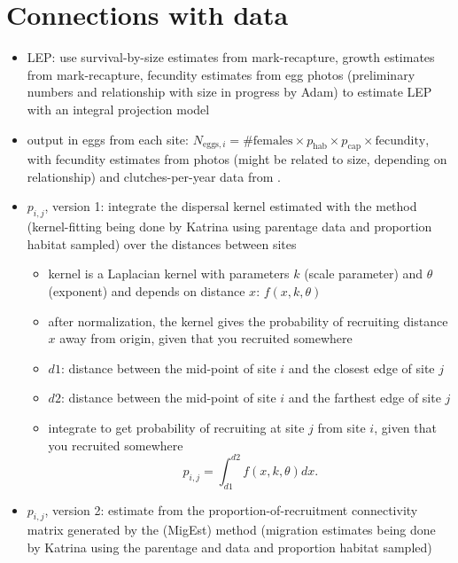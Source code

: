 \documentclass[12pt, oneside]{article}   	%
\begin{document}
\section{Connections with data}
\begin{itemize}
	\item LEP: use survival-by-size estimates from mark-recapture, growth estimates from mark-recapture, fecundity estimates from egg photos (preliminary numbers and relationship with size in progress by Adam) to estimate LEP with an integral projection model
	\item output in eggs from each site:
	$N_{\text{eggs}, i} = \# \text{females} \times p_{\text{hab}} \times p_{\text{cap}} \times \text{fecundity}$, with fecundity estimates from photos (might be related to size, depending on relationship) and clutches-per-year data from \cite{holtswarth2017fecundity}.
	\item $p_{i,j}$, version 1: integrate the dispersal kernel estimated with the \cite{bode2018estimating} method (kernel-fitting being done by Katrina using parentage data and proportion habitat sampled) over the distances between sites
		\begin{itemize}
			\item kernel is a Laplacian kernel with parameters $k$ (scale parameter) and $\theta$ (exponent) and depends on distance $x$: $f(x,k,\theta)$
			\item after normalization, the kernel gives the probability of recruiting distance $x$ away from origin, given that you recruited somewhere
			\item $d1$: distance between the mid-point of site $i$ and the closest edge of site $j$ 
			\item $d2$: distance between the mid-point of site $i$ and the farthest edge of site $j$
			\item integrate to get probability of recruiting at site $j$ from site $i$, given that you recruited somewhere
			\begin{equation}
			p_{i,j} = \int_{d1}^{d2}{f(x,k,\theta) dx}. \label{PijfromKernel}
			\end{equation}
		\end{itemize}
	\item $p_{i,j}$, version 2: estimate from the proportion-of-recruitment connectivity matrix generated by the \cite{wang2014estimation} (MigEst) method (migration estimates being done by Katrina using the parentage and data and proportion habitat sampled) 
		\begin{itemize}

\end{itemize}
\end{itemize}
\end{document}
